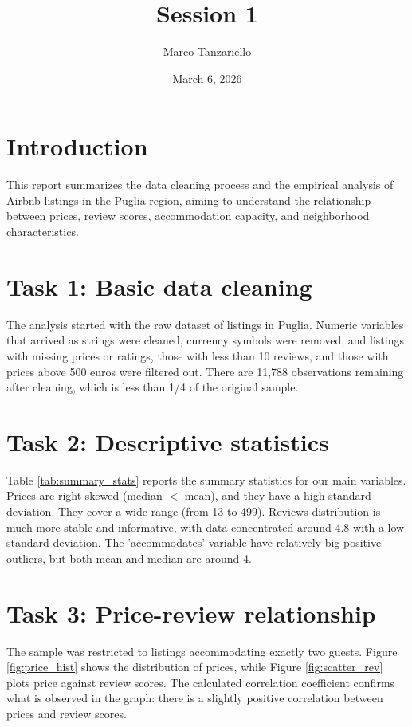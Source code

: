 \documentclass[12pt]{article}
\title{Session 1}
\date{March 6, 2026}
\author{Marco Tanzariello}
\newcommand{\tablepath}{../analysis/output/tables/}
\begin{document}
\maketitle
\section*{Introduction}
This report summarizes the data cleaning process and the empirical analysis of Airbnb listings in the Puglia region, aiming to understand the relationship between prices, review scores, accommodation capacity, and neighborhood characteristics.

\section{Task 1: Basic data cleaning}
The analysis started with the raw dataset of listings in Puglia. Numeric variables that arrived as strings were cleaned, currency symbols were removed, and listings with missing prices or ratings, those with less than 10 reviews, and those with prices above 500 euros were  filtered out. 
There are 11,788 observations remaining after cleaning, which is less than 1/4 of the original sample.

\section{Task 2: Descriptive statistics}
Table \ref{tab:summary_stats} reports the summary statistics for our main variables. 
Prices are right-skewed (median $<$ mean), and they have a high standard deviation. They cover a wide range (from 13 to 499). Reviews distribution is much more stable and informative, with data concentrated around 4.8 with a low standard deviation. The 'accommodates' variable have relatively big positive outliers, but both mean and median are around 4.

\begin{table}[h!]
    \centering
    \caption{Summary Statistics (Price, Reviews, Accommodates)}
    \label{tab:summary_stats}
     
\end{table}

\clearpage

\section{Task 3: Price-review relationship}
The sample was restricted to listings accommodating exactly two guests. Figure \ref{fig:price_hist} shows the distribution of prices, while Figure \ref{fig:scatter_rev} plots price against review scores. The calculated correlation coefficient confirms what is observed in the graph: there is a slightly positive correlation between prices and review scores.
\end{document}

